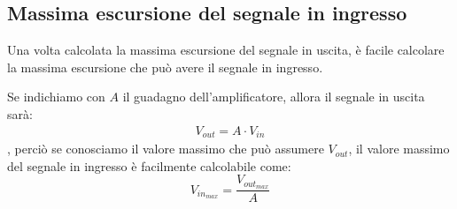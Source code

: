 \documentclass[a4paper,twocolumn,notitlepage]{book}
\begin{document}
	\subsection*{Massima escursione del segnale in ingresso}
	Una volta calcolata la massima escursione del segnale in uscita, è facile calcolare la massima escursione che può avere il segnale in ingresso.
	
	Se indichiamo con $A$ il guadagno dell'amplificatore, allora il segnale in uscita sarà:
	\begin{align*}
		V_{out}= A \cdot V_{in}
	\end{align*}		
	, perciò se conosciamo il valore massimo che può assumere $V_{out}$, il valore massimo del segnale in ingresso è facilmente calcolabile come:
	\begin{equation}
		V_{in_{max}}=\frac{V_{out_{max}}}{A}
	\end{equation}
	
\end{document}
